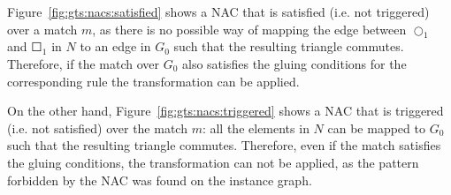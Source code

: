 \begin{example} Figure~\ref{fig:gts:nacs:satisfied} shows a NAC that is satisfied (i.e. not triggered) over a match $m$, as there is no possible way of mapping the edge between $\Circle_1$ and $\Square_1$ in $N$ to an edge in $G_0$ such that the resulting triangle commutes. Therefore, if the match over $G_0$ also satisfies the gluing conditions for the corresponding rule the transformation can be applied.

  On the other hand, Figure~\ref{fig:gts:nacs:triggered} shows a NAC that is triggered (i.e. not satisfied) over the match $m$: all the elements in $N$ can be mapped to $G_0$ such that the resulting triangle commutes. Therefore, even if the match satisfies the gluing conditions, the transformation can not be applied, as the pattern forbidden by the NAC was found on the instance graph.


\end{example}
